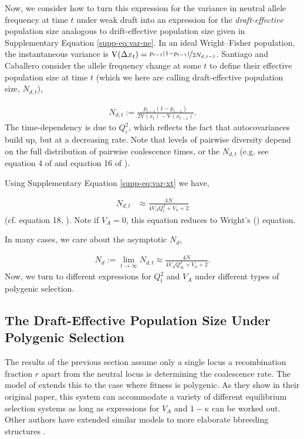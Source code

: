 \documentclass[11pt]{article}
\newcommand{\V}{\text{V}}
\begin{document}
Now, we consider how to turn this expression for the variance in neutral allele
frequency at time $t$ under weak draft into an expression for the
\emph{draft-effective} population size analogous to drift-effective population
size given in Supplementary Equation \eqref{supp-eq:var-ne}. In an ideal
Wright--Fisher population, the instantaneous variance is $\V(\Delta x_t) =
\nicefrac{p_{t-1}(1-p_{t-1})}{2N_{d,t-1}}$. Santiago and Caballero consider the
allele frequency change at some $t$ to define their effective population size
at time $t$ (which we here are calling draft-effective population size,
$N_{d,t}$),

\begin{align}
    N_{d,t} := \frac{p_{t-1} (1-p_{t-1})}{2\V(x_t) - \V(x_{t-1})}.
\end{align}
%
The time-dependency is due to $Q_i^2$, which reflects the fact that
autocovariances build up, but at a decreasing rate. Note that levels of
pairwise diversity depend on the full distribution of pairwise coalescence
times, or the $N_{d,t}$ (e.g. see equation 4 of \cite{Santiago2016-mu} and
equation 16 of \cite{Santiago1998-bs}).

Using Supplementary Equation \eqref{supp-eq:var-xt} we have,

\begin{align}
    \label{supp-eq:var-ndt}
    N_{d,t} &\approx \frac{4N}{4 V_A Q_t^2 +V_n+2}
\end{align}
%
(cf. equation 18, \cite{Santiago1995-hx}). Note if $V_A = 0$, this equation
reduces to Wright's (\citeyear{Wright1938-tv}) equation. 

In many cases, we care about the asymptotic $N_d$, 

\begin{align}
    N_d := \lim_{t \to \infty} N_{d,t} \approx \frac{4N}{4 V_A Q_\infty^2 +V_n+2}.
\end{align}
%
Now, we turn to different expressions for $Q_t^2$ and $V_A$ under different
types of polygenic selection.

\subsection{The Draft-Effective Population Size Under Polygenic Selection}
\label{supp:ne-polygenic}

The results of the previous section assume only a single locus a recombination
fraction $r$ apart from the neutral locus is determining the coalescence rate. The
model of \textcite{Santiago1998-bs} extends this to the case where fitness is
polygenic. As they show in their original paper, this system can accommodate a
variety of different equilibrium selection systems as long as expressions for
$V_A$ and $1-\kappa$ can be worked out. Other authors have extended similar models to
more elaborate bbreeding structures \parencite{Wray1990-zf,Woolliams1993-qo}.
\end{document}
